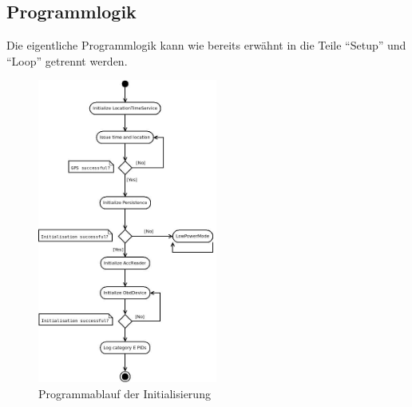 \subsection{Programmlogik}
\label{subsec:ProgLogik}
Die eigentliche Programmlogik kann wie bereits erwähnt in die Teile \enquote{Setup} und \enquote{Loop} getrennt werden.
\begin{figure}
  \begin{center}
    \includegraphics[width=\textwidth,height=10cm,keepaspectratio]{./img/Startup}
    \caption{Programmablauf der Initialisierung}
    \label{fig:setup}
  \end{center}
\end{figure}
